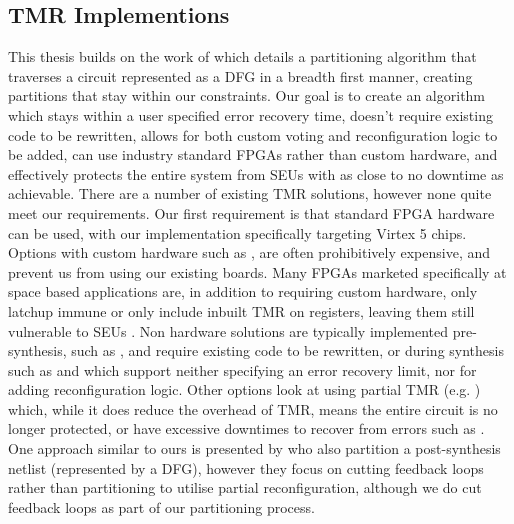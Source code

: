 \documentclass[12pt,final,oneside]{memoir} %
\begin{document}
\subsection{\acl{TMR} Implementions}
This thesis builds on the work of\cite{DiesselChange} which details a partitioning algorithm that traverses a circuit represented as a \ac{DFG} in a breadth first manner, creating partitions that stay within our constraints.
Our goal is to create an algorithm which stays within a user specified error recovery time, doesn't require existing code to be rewritten, allows for both custom voting and reconfiguration logic to be added, can use industry standard \acp{FPGA} rather than custom hardware, and effectively protects the entire system from \acp{SEU} with as close to no downtime as achievable. There are a number of existing \ac{TMR} solutions, however none quite meet our requirements.
Our first requirement is that standard \ac{FPGA} hardware can be used, with our implementation specifically targeting Virtex 5 chips. Options with custom hardware such as \cite{VFPGATMR}, are often prohibitively expensive, and prevent us from using our existing boards.
Many \acp{FPGA} marketed specifically at space based applications are, in addition to requiring custom hardware, only latchup immune or only include inbuilt \ac{TMR} on registers, leaving them still vulnerable to \acp{SEU} \cite{FPGAReview}.
Non hardware solutions are typically implemented pre-synthesis, such as \cite{ftmr}, and require existing code to be rewritten, or during synthesis such as \cite{synplify} and \cite{tmrtool} which support neither specifying an error recovery limit, nor for adding reconfiguration logic.
Other options look at using partial \ac{TMR} (e.g. \cite{partialTMR}) which, while it does reduce the overhead of \ac{TMR}, means the entire circuit is no longer protected, or have excessive downtimes to recover from errors such as \cite{VTMR}.
One approach similar to ours is presented by \cite{PostSynth} who also partition a post-synthesis netlist (represented by a \ac{DFG}), however they focus on cutting feedback loops rather than partitioning to utilise partial reconfiguration, although we do cut feedback loops as part of our partitioning process.
\end{document}
